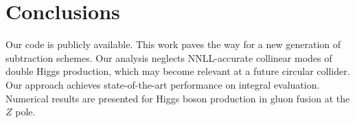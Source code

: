 \section{Conclusions}\label{sec:conclusions}

Our code is publicly available. This work paves the way for a new
generation of subtraction schemes. Our analysis neglects NNLL-accurate
collinear modes of double Higgs production, which may become relevant at
a future circular collider. Our approach achieves state-of-the-art
performance on integral evaluation. Numerical results are presented for
Higgs boson production in gluon fusion at the $Z$ pole.

